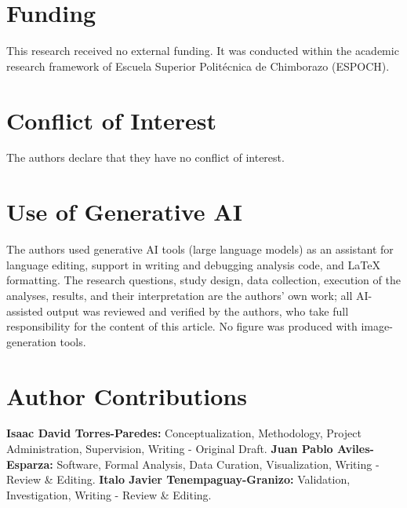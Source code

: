 \documentclass{cleiej}
\begin{document}
\section*{Funding}
This research received no external funding. It was conducted within the academic research framework of Escuela Superior Polit\'ecnica de Chimborazo (ESPOCH).

\section*{Conflict of Interest}
The authors declare that they have no conflict of interest.

\section*{Use of Generative AI}
The authors used generative AI tools (large language models) as an assistant for language editing, support in writing and debugging analysis code, and LaTeX formatting. The research questions, study design, data collection, execution of the analyses, results, and their interpretation are the authors' own work; all AI-assisted output was reviewed and verified by the authors, who take full responsibility for the content of this article. No figure was produced with image-generation tools.

\section*{Author Contributions}
\textbf{Isaac David Torres-Paredes:} Conceptualization, Methodology, Project Administration, Supervision, Writing - Original Draft. \textbf{Juan Pablo Aviles-Esparza:} Software, Formal Analysis, Data Curation, Visualization, Writing - Review \& Editing. \textbf{Italo Javier Tenempaguay-Granizo:} Validation, Investigation, Writing - Review \& Editing.


\end{document}
